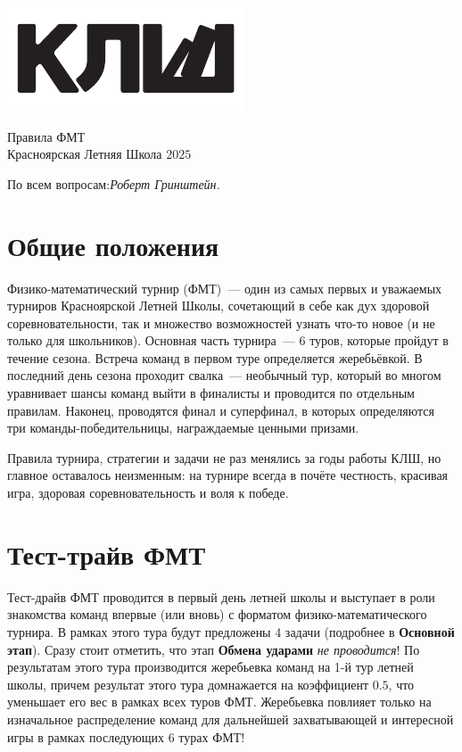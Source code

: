 \documentclass[12pt]{article}
\begin{document}
\begin{flushleft}
\parbox[t][0pt]{0.2\textwidth}
{
{%
\vspace{0\baselineskip}
\includegraphics[scale=1.5]{klsh_logo_mod.pdf}\par
}
}
\end{flushleft}
\newcommand{\klshyear}{2025}
\hfill
\parbox[t][0pt]{0.80\textwidth}
{
{\centering
\vspace{-1.5\baselineskip}
\begin{flushright}
{\Huge Правила ФМТ}\\
{Красноярская Летняя Школа $\klshyear$}\par
По всем вопросам:{\it  Роберт Гринштейн.}
\end{flushright}
}
}
\vspace{4\baselineskip}

\section*{Общие положения}
Физико-математический турнир (ФМТ)~--- один из самых первых и уважаемых турниров Красноярской Летней Школы, сочетающий в себе как дух здоровой соревновательности, так и множество возможностей узнать что-то новое (и не только для школьников). Основная часть турнира~--- 6 туров, которые пройдут в течение сезона. Встреча команд в первом туре определяется жеребьёвкой. В последний день сезона проходит свалка~--- необычный тур, который во многом уравнивает шансы команд выйти в финалисты и проводится по отдельным правилам. Наконец, проводятся финал и суперфинал, в которых определяются три команды-победительницы, награждаемые ценными призами.

Правила турнира, стратегии и задачи не раз менялись за годы работы КЛШ, но главное оставалось неизменным: на турнире всегда в почёте честность, красивая игра, здоровая соревновательность и воля к победе.

\section*{Тест-трайв ФМТ}
Тест-драйв ФМТ проводится в первый день летней школы и выступает в роли знакомства команд впервые (или вновь) с форматом физико-математического турнира. В рамках этого тура будут предложены 4 задачи (подробнее в \textbf{Основной этап}). Сразу стоит отметить, что этап \textbf{Обмена ударами} \textit{не проводится}!  По результатам этого тура производится жеребьевка команд на 1-й тур летней школы, причем результат этого тура домнажается на коэффициент $0.5$, что уменьшает его вес в рамках всех туров ФМТ. Жеребьевка повлияет только на изначальное распределение команд для дальнейшей захватывающей и интересной игры в рамках последующих 6 турах ФМТ!
\end{document}
